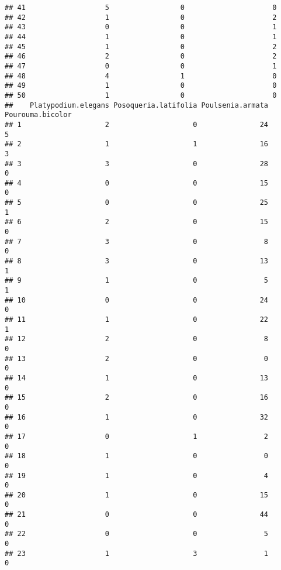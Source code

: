 \documentclass[
]{article}
\begin{document}
\begin{verbatim}
## 41                   5                 0                     0
## 42                   1                 0                     2
## 43                   0                 0                     1
## 44                   1                 0                     1
## 45                   1                 0                     2
## 46                   2                 0                     2
## 47                   0                 0                     1
## 48                   4                 1                     0
## 49                   1                 0                     0
## 50                   1                 0                     0
##    Platypodium.elegans Posoqueria.latifolia Poulsenia.armata Pourouma.bicolor
## 1                    2                    0               24                5
## 2                    1                    1               16                3
## 3                    3                    0               28                0
## 4                    0                    0               15                0
## 5                    0                    0               25                1
## 6                    2                    0               15                0
## 7                    3                    0                8                0
## 8                    3                    0               13                1
## 9                    1                    0                5                1
## 10                   0                    0               24                0
## 11                   1                    0               22                1
## 12                   2                    0                8                0
## 13                   2                    0                0                0
## 14                   1                    0               13                0
## 15                   2                    0               16                0
## 16                   1                    0               32                0
## 17                   0                    1                2                0
## 18                   1                    0                0                0
## 19                   1                    0                4                0
## 20                   1                    0               15                0
## 21                   0                    0               44                0
## 22                   0                    0                5                0
## 23                   1                    3                1                0

\end{verbatim}
\end{document}
